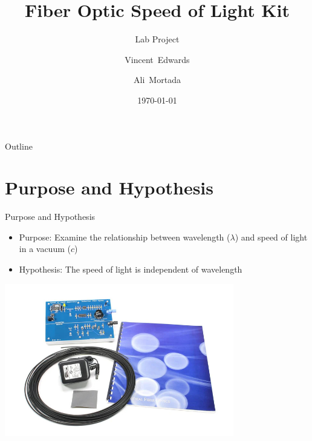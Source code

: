 \documentclass{beamer}
\title{Fiber Optic Speed of Light Kit}
\subtitle{Lab Project}
\author{Vincent~Edwards \and Ali~Mortada}
\institute{Mt.~San Antonio College, Physics 4C, CRN 20889}
\date{\today}
\begin{document}
\begin{frame}
  \titlepage
\end{frame}

\begin{frame}{Outline}
  \tableofcontents
\end{frame}

\section{Purpose and Hypothesis}
\begin{frame}{Purpose and Hypothesis}
  \begin{itemize}
    \item Purpose: Examine the relationship between wavelength ($\lambda$) and speed of light in a vacuum ($c$)
    \item Hypothesis: The speed of light is independent of wavelength
  \end{itemize}
  \begin{center}
    \includegraphics[width=0.75\textwidth]{speed-of-light-apparatus.jpg}
  \end{center}
\end{frame}

\end{document}
